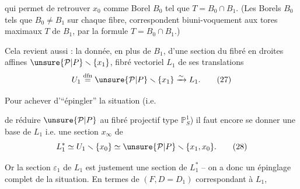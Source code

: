 
qui permet  de retrouver $x_0$ comme 
  Borel $B_0$ tel que
$T=B_0\cap B_1$.
(Les Borels $B_0$ tels que $B_0\ne B_1$ sur chaque fibre,
correspondent biuni-voquement aux tores maximaux $T$ de $B_1$, par la formule
 $T=B_0\cap B_1$.)

Cela revient aussi : la donnée, en plus de $B_1$, 
d'une section  du fibré en droites affines
$\unsure{\mathcal P|P}\smallsetminus\{x_1\}$,
fibré vectoriel $L_1$ de ses translations
\[
U_1\overset{\mathrm{dfn}}{=}\unsure{\mathcal P|P}\smallsetminus\{x_1\}\xrightarrow{\sim}L_1.
\tag{27}
\]

Pour achever d'``épingler'' la situation (i.e.



de réduire $\unsure{\mathcal P|P}$ au fibré projectif type $\mathbb P^1_S$)
il faut encore se donner une base de $L_1$ i.e. une section $x_\infty$ de
\[
L_1^*\simeq U_1\smallsetminus\{x_0\}\simeq\unsure{\mathcal P|P}\smallsetminus\{x_1,x_0\}.
\tag{28}
\]

Or la section $\varepsilon_1$ de $L_1$ est justement une section de $L_1^*$ -- on a donc un épinglage complet de la situation.
En termes de $(F,D=D_1)$ correspondant à $L_1$,

